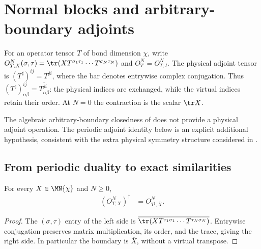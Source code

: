 
\section{Normal blocks and arbitrary-boundary adjoints}
\label{sec:glm_normal_adjoint_boundary}

For an operator tensor $T$ of bond dimension $\chi$, write
$O^N_{T,X}(\sigma,\tau)=\tr(XT^{\sigma_1\tau_1}\cdots
    T^{\sigma_N\tau_N})$ and $O_T^N=O^N_{T,I}$.
The physical adjoint tensor is
$(T^\sharp)^{ij}=\overline{T^{ji}}$, where the bar denotes entrywise
complex conjugation. Thus
$(T^\sharp)^{ij}_{\alpha\beta}=\overline{T^{ji}_{\alpha\beta}}$:
the physical indices are exchanged, while the virtual indices retain
their order. At $N=0$ the contraction is the scalar $\tr X$.

The algebraic arbitrary-boundary closedness of
\cite[Section~2]{GarreRubio2023MPOSym} does not provide a physical
adjoint operation. The periodic adjoint identity below is an explicit
additional hypothesis, consistent with the extra physical symmetry
structure considered in \cite[Section~5]{GarreRubio2023MPOSym}.

\subsection{From periodic duality to exact similarities}

\begin{lemma}
    \label{thm:glm_boundary_physical_adjoint}
    \leanok
    For every $X\in\MN{\chi}$ and $N\geq0$,
    \begin{align}
        (O^N_{T,X})^\dagger & =O^N_{T^\sharp,\overline X}.
        \label{eq:glm_boundary_physical_adjoint}
    \end{align}
\end{lemma}
\begin{proof}\leanok
    The $(\sigma,\tau)$ entry of the left side is
    $\overline{\tr(XT^{\tau_1\sigma_1}\cdots
            T^{\tau_N\sigma_N})}$.
    Entrywise conjugation preserves matrix multiplication, its order,
    and the trace, giving the right side. In particular the boundary
    is $\overline X$, without a virtual transpose.
\end{proof}

